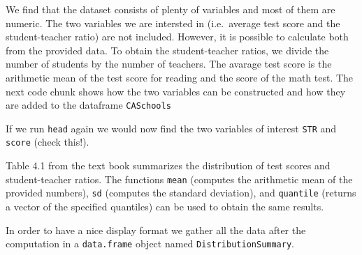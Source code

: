 \documentclass[]{book}
\newenvironment{Shaded}{\begin{snugshade}}{\end{snugshade}}
\newcommand{\DecValTok}[1]{\textcolor[rgb]{0.00,0.00,0.81}{#1}}
\newcommand{\StringTok}[1]{\textcolor[rgb]{0.31,0.60,0.02}{#1}}
\newcommand{\OperatorTok}[1]{\textcolor[rgb]{0.81,0.36,0.00}{\textbf{#1}}}
\newcommand{\NormalTok}[1]{#1}
\theoremstyle{definition}
\theoremstyle{definition}
\theoremstyle{definition}
\theoremstyle{remark}
\begin{document}
We find that the dataset consists of plenty of variables and most of
them are numeric. The two variables we are intersted in (i.e.~average
test score and the student-teacher ratio) are not included. However, it
is possible to calculate both from the provided data. To obtain the
student-teacher ratios, we divide the number of students by the number
of teachers. The avarage test score is the arithmetic mean of the test
score for reading and the score of the math test. The next code chunk
shows how the two variables can be constructed and how they are added to
the dataframe \texttt{CASchools}

\begin{Shaded}
\end{Shaded}

If we run \texttt{head} again we would now find the two variables of
interest \texttt{STR} and \texttt{score} (check this!).

Table 4.1 from the text book summarizes the distribution of test scores
and student-teacher ratios. The functions \texttt{mean} (computes the
arithmetic mean of the provided numbers), \texttt{sd} (computes the
standard deviation), and \texttt{quantile} (returns a vector of the
specified quantiles) can be used to obtain the same results.

In order to have a nice display format we gather all the data after the
computation in a \texttt{data.frame} object named
\texttt{DistributionSummary}.
\end{document}
